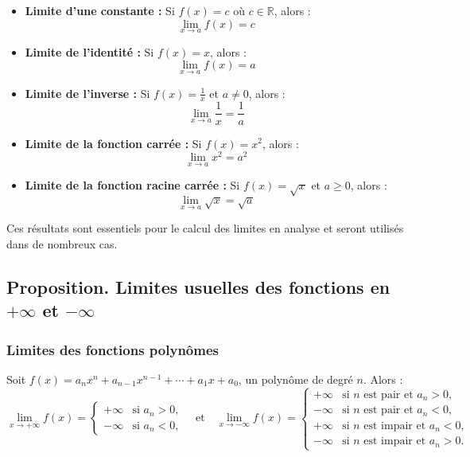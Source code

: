 \documentclass{article}
\begin{document}
\begin{itemize}
	\item \textbf{Limite d'une constante :} Si \( f(x) = c \) où \( c \in \mathbb{R} \), alors :
	\[
	\lim_{x \to a} f(x) = c
	\]
	
	\item \textbf{Limite de l'identité :} Si \( f(x) = x \), alors :
	\[
	\lim_{x \to a} f(x) = a
	\]
	
	\item \textbf{Limite de l'inverse :} Si \( f(x) = \frac{1}{x} \) et \( a \neq 0 \), alors :
	\[
	\lim_{x \to a} \frac{1}{x} = \frac{1}{a}
	\]
	
	\item \textbf{Limite de la fonction carrée :} Si \( f(x) = x^2 \), alors :
	\[
	\lim_{x \to a} x^2 = a^2
	\]
	
	\item \textbf{Limite de la fonction racine carrée :} Si \( f(x) = \sqrt{x} \) et \( a \geq 0 \), alors :
	\[
	\lim_{x \to a} \sqrt{x} = \sqrt{a}
	\]
	
	

\end{itemize}

Ces résultats sont essentiels pour le calcul des limites en analyse et seront utilisés dans de nombreux cas.


\subsection{Proposition. Limites usuelles des fonctions en \( +\infty \) et \( -\infty \)}

\subsubsection{Limites des fonctions polynômes}
Soit \( f(x) = a_n x^n + a_{n-1} x^{n-1} + \cdots + a_1 x + a_0 \), un polynôme de degré \( n \). Alors :
\[
\lim_{x \to +\infty} f(x) =
\begin{cases} 
	+ \infty & \text{si } a_n > 0, \\
	- \infty & \text{si } a_n < 0, 
\end{cases}
\quad \text{et} \quad
\lim_{x \to -\infty} f(x) =
\begin{cases} 
	+ \infty & \text{si } n \text{ est pair et } a_n > 0, \\
	- \infty & \text{si } n \text{ est pair et } a_n < 0, \\
	+ \infty & \text{si } n \text{ est impair et } a_n < 0, \\
	- \infty & \text{si } n \text{ est impair et } a_n > 0.
\end{cases}
\]
\end{document}

